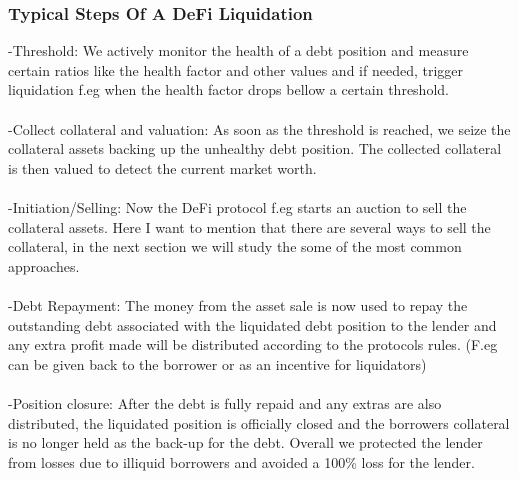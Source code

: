 \documentclass{article}
\begin{document}
    \subsubsection{Typical Steps Of A DeFi Liquidation}
    -Threshold: We actively monitor the health of a debt position and measure certain ratios like the health factor and other values and if needed, trigger liquidation f.eg when the health factor drops bellow a certain threshold.\\\\
    -Collect collateral and valuation: As soon as the threshold is reached, we seize the collateral assets backing up the unhealthy debt position. The collected collateral is then valued to detect the current market worth.\\\\
    -Initiation/Selling: Now the DeFi protocol f.eg starts an auction to sell the collateral assets. Here I want to mention that there are several ways to sell the collateral, in the next section we will study the some of the most common approaches.\\\\
    -Debt Repayment: The money from the asset sale is now used to repay the outstanding debt associated with the liquidated debt position to the lender and any extra profit made will be distributed according to the protocols rules. (F.eg can be given back to the borrower or as an incentive for liquidators) \\\\
    -Position closure: After the debt is fully repaid and any extras are also distributed, the liquidated position is officially closed and the borrowers collateral is no longer held as the back-up for the debt.  Overall we protected the lender from losses due to illiquid borrowers and avoided a 100\% loss for the lender.
\end{document}
